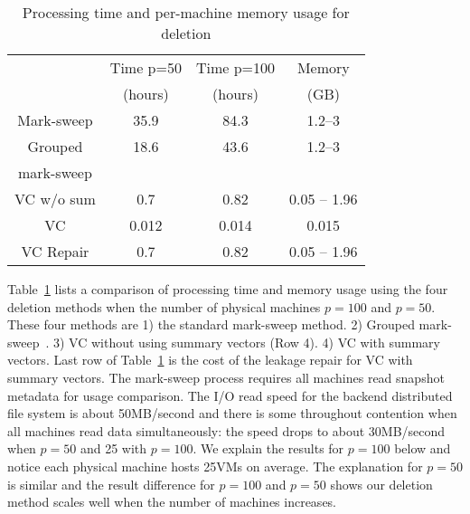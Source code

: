 

\begin{table}[htb]
\centering
\begin{tabular}{|c|c|c|c|}
    \hline 
	    &Time p=50 & Time p=100 & Memory \\
	    &(hours)  & (hours) & (GB) \\
\hline
Mark-sweep  & 35.9  &  84.3  & 1.2--3 \\
\hline
Grouped &     18.6    & 43.6   & 1.2--3 \\
mark-sweep &        &    &  \\
\hline
VC w/o sum &  0.7     & 0.82   & 0.05 -- 1.96 \\
\hline
VC  &  0.012      & 0.014   & 0.015  \\
\hline
\hline
VC Repair  &  0.7      & 0.82   & 0.05 -- 1.96 \\
\hline
    \end{tabular}
    \caption{ Processing time and per-machine memory usage  for
deletion}  
    \label{tab:deletion-cmp}
\end{table}

Table~\ref{tab:deletion-cmp}   lists a comparison of processing time and memory usage
using the four deletion methods when the number of physical machines
$p=100$ and $p=50$. These four 
methods are 1) the standard mark-sweep method. 2) Grouped mark-sweep~\cite{Guo2011}. 
3)   VC without using summary vectors (Row 4). 4) VC with summary vectors.
Last row of Table~\ref{tab:deletion-cmp} 
is the cost of the leakage  repair for VC with summary vectors.
The mark-sweep process requires all machines read snapshot metadata for usage comparison.
The I/O read speed for the backend distributed file system is about 50MB/second
and there is some throughout contention when all machines read data simultaneously:
the speed drops to about 30MB/second when $p=50$ and 25 with $p=100$.
We explain the results for $p=100$ below and notice each physical machine hosts 25VMs on average. 
The explanation for $p=50$ is similar and the result difference for $p=100$ and $p=50$ shows
our deletion method scales well when the number of machines increases.


